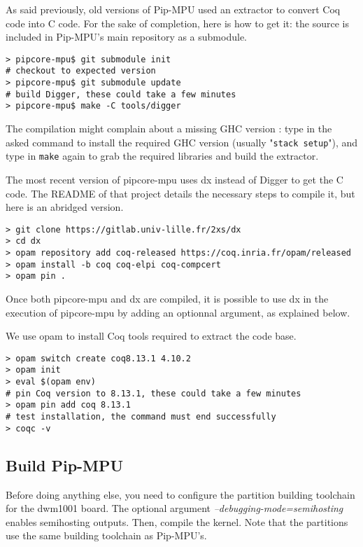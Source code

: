 \documentclass[10pt,a4paper,titlepage]{refart}
\begin{document}
As said previously, old versions of Pip-MPU used an extractor to convert Coq code into C code.
For the sake of completion, here is how to get it: the source is included in Pip-MPU's main repository as a submodule.
\begin{lstlisting}[style=BashStyle]
> pipcore-mpu$ git submodule init
# checkout to expected version
> pipcore-mpu$ git submodule update
# build Digger, these could take a few minutes
> pipcore-mpu$ make -C tools/digger
\end{lstlisting}
The compilation might complain about a missing GHC version : type in the asked command to install the required GHC version (usually "\texttt{stack setup}"), and type in \texttt{make} again to grab the required libraries and build the extractor.

The most recent version of pipcore-mpu uses dx instead of Digger to get the C code. The README 
of that project details the necessary steps to compile it, but here is an abridged version.

\begin{lstlisting}[style=BashStyle]
> git clone https://gitlab.univ-lille.fr/2xs/dx
> cd dx
> opam repository add coq-released https://coq.inria.fr/opam/released
> opam install -b coq coq-elpi coq-compcert
> opam pin .
\end{lstlisting}

Once both pipcore-mpu and dx are compiled, it is possible to use dx in the execution of pipcore-mpu by adding an optionnal argument, as explained below.

We use opam to install Coq tools required to extract the code base.

\begin{lstlisting}[style=BashStyle]
> opam switch create coq8.13.1 4.10.2
> opam init
> eval $(opam env)
# pin Coq version to 8.13.1, these could take a few minutes
> opam pin add coq 8.13.1
# test installation, the command must end successfully
> coqc -v
\end{lstlisting}

\subsection{Build Pip-MPU} \label{buildpip}
Before doing anything else, you need to configure the partition building toolchain for the dwm1001 board.
The optional argument \textit{--debugging-mode=semihosting} enables semihosting outputs.
Then, compile the kernel.
Note that the partitions use the same building toolchain as Pip-MPU's.
\end{document}
